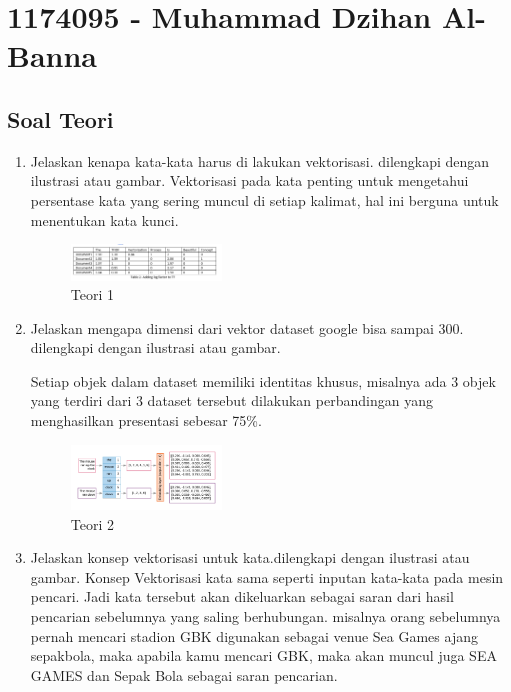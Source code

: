 \section{1174095 - Muhammad Dzihan Al-Banna}
\subsection{Soal Teori}
\begin{enumerate}

	\item Jelaskan kenapa kata-kata harus di lakukan vektorisasi. dilengkapi dengan ilustrasi atau gambar.
	\hfill\break
	Vektorisasi pada kata penting untuk mengetahui persentase kata yang sering muncul di setiap kalimat, hal ini berguna untuk menentukan kata kunci.

	\begin{figure}[H]
	\centering
		\includegraphics[width=4cm]{figures/1174095/tugas5/1.png}
		\caption{Teori 1}
	\end{figure}

	\item Jelaskan mengapa dimensi dari vektor dataset google bisa sampai 300. dilengkapi dengan ilustrasi atau gambar.

	\hfill\break 
	Setiap objek dalam dataset memiliki identitas khusus, misalnya ada 3 objek yang terdiri dari 3 dataset tersebut dilakukan perbandingan yang menghasilkan presentasi sebesar 75\%.
	\begin{figure}[H]
	\centering
		\includegraphics[width=4cm]{figures/1174095/tugas5/2.png}
		\caption{Teori 2}
	\end{figure}
	
	\item Jelaskan konsep vektorisasi untuk kata.dilengkapi dengan ilustrasi atau gambar.
	\hfill\break
	Konsep Vektorisasi kata sama seperti inputan kata-kata pada mesin pencari. Jadi kata tersebut akan dikeluarkan sebagai saran dari hasil pencarian sebelumnya yang saling berhubungan. misalnya orang sebelumnya pernah mencari stadion GBK digunakan sebagai venue Sea Games ajang sepakbola, maka apabila kamu mencari GBK, maka akan muncul juga SEA GAMES dan Sepak Bola sebagai saran pencarian.


\end{enumerate}
